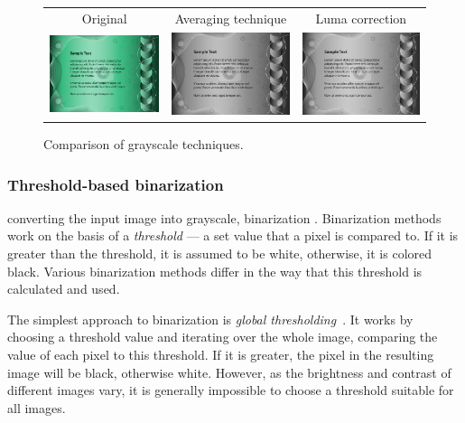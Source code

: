\begin{figure}[t]
\centering
{\sffamily
\begin{tabular}{ccc}
Original & Averaging technique & Luma correction \\
\includegraphics[width=.28\linewidth]{img/preprocessing/grayscale_orig.jpg}
&
\includegraphics[width=.28\linewidth]{img/preprocessing/grayscale_avg.png}
&
\includegraphics[width=.28\linewidth]{img/preprocessing/grayscale_luma.png}
\end{tabular}
}
\caption{Comparison of grayscale techniques.}
\label{fig:preprocessGrayscale}
\end{figure}

\subsubsection{Threshold-based binarization}
 converting the input image into grayscale, binarization . Binarization methods work on the basis of a \emph{threshold} --- a set value that a pixel is compared to. If it is greater than the threshold, it is assumed to be white, otherwise, it is colored black. Various binarization methods differ in the way that this threshold is calculated and used.

The simplest approach to binarization is \emph{global thresholding}~\citep{globalThresh}. It works by choosing a threshold value and iterating over the whole image, comparing the value of each pixel to this threshold. If it is greater, the pixel in the resulting image will be black, otherwise white. However, as the brightness and contrast of different images vary, it is generally impossible to choose a threshold suitable for all images.

